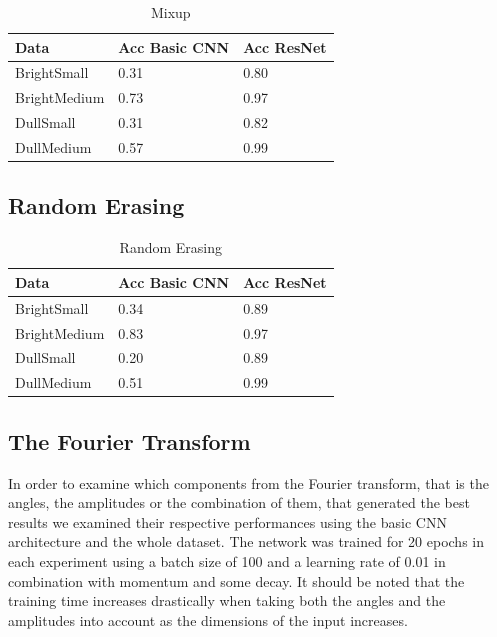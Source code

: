 \documentclass{article}
\begin{document}
\begin{table}[H]
	\caption{Mixup }
	\label{sample-table}
	\centering
	\begin{tabular}{lll}
		\toprule
		Data &  Acc Basic CNN & Acc ResNet \\
		\midrule
		
		BrightSmall  & 0.31 &     0.80 \\
		BrightMedium & 0.73 &     0.97 \\
		DullSmall    & 0.31 &     0.82 \\
		DullMedium   & 0.57 &     0.99 \\
		\bottomrule
	\end{tabular}
\end{table}


\subsection{Random Erasing}


\begin{table}[H]
	\caption{Random Erasing }
	\label{sample-table}
	\centering
	\begin{tabular}{lll}
		
		\toprule
		Data & Acc Basic CNN & Acc ResNet \\
		\midrule
		
		BrightSmall   & 0.34 & 0.89  \\
		BrightMedium  & 0.83 & 0.97  \\
		DullSmall     & 0.20 & 0.89  \\
		DullMedium    & 0.51 & 0.99  \\
		\bottomrule
	\end{tabular}
\end{table}



\subsection{The Fourier Transform}

In order to examine which components from the Fourier transform, that is the angles, the amplitudes or the combination of them, that generated the best results we examined their respective performances using the basic CNN architecture and the whole dataset. The network was trained for 20 epochs in each experiment using a batch size of 100 and a learning rate of 0.01 in combination with momentum and some decay. It should be noted that the training time increases drastically when taking both the angles and the amplitudes into account as the dimensions of the input increases.
\end{document}
